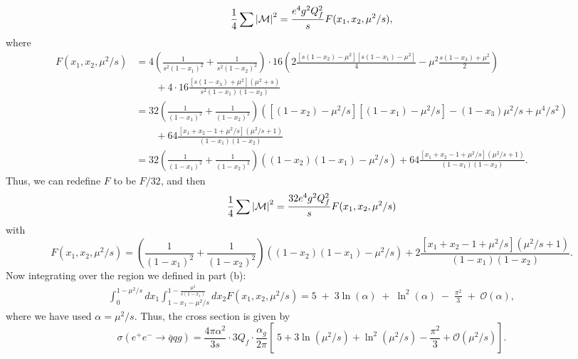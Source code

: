 \documentclass[11pt]{article}
\theoremstyle{definition}
\begin{document}
\begin{equation}
    \frac{1}{4}\sum\abs{\mathcal{M}}^2 = \frac{e^4g^2Q_f^2}{s}F(x_1,x_2,\mu^2/s),
\end{equation}
where
\begin{equation}
\begin{aligned}
        F(x_1,x_2,\mu^2/s) &= 4\left(\frac{1}{s^2(1-x_1)^2} + \frac{1}{s^2(1-x_2)^2}\right)\cdot 16\left(2\frac{[s(1-x_2)-\mu^2][s(1-x_1)-\mu^2]}{4} - \mu^2\frac{s(1-x_3)+\mu^2}{2}\right)\\
        &\qquad + 4\cdot16\frac{[s(1-x_3)+\mu^2](\mu^2+s)}{s^2(1-x_1)(1-x_2)}\\
        &= 32\left(\frac{1}{(1-x_1)^2} +\frac{1}{(1-x_2)^2}\right) \left([(1-x_2)-\mu^2/s][(1-x_1)-\mu^2/s] - (1-x_3)\mu^2/s+\mu^4/s^2\right)\\
        &\qquad + 64\frac{[x_1+x_2-1+\mu^2/s](\mu^2/s+1)}{(1-x_1)(1-x_2)}\\
        &=32\left(\frac{1}{(1-x_1)^2} +\frac{1}{(1-x_2)^2}\right) \left((1-x_2)(1-x_1) - \mu^2/s\right) + 64\frac{[x_1+x_2-1+\mu^2/s](\mu^2/s+1)}{(1-x_1)(1-x_2)}.
\end{aligned}
\end{equation}
Thus, we can redefine $F$ to be $F/32$, and then
\begin{equation}
    \frac{1}{4}\sum\abs{\mathcal{M}}^2 = \frac{32e^4g^2Q_f^2}{s}F(x_1,x_2,\mu^2/s)
\end{equation}
with
\begin{equation}
    F(x_1,x_2,\mu^2/s) = \left(\frac{1}{(1-x_1)^2} +\frac{1}{(1-x_2)^2}\right) \left((1-x_2)(1-x_1) - \mu^2/s\right) + 2\frac{[x_1+x_2-1+\mu^2/s](\mu^2/s+1)}{(1-x_1)(1-x_2)}.
\end{equation}
Now integrating over the region we defined in part (b):
\begin{equation}
    \begin{aligned}
        \int_0^{1-\mu^2/s} dx_1\int_{1-x_1-\mu^2/s}^{1-\frac{\mu^2}{s(1-x_1)}}dx_2 F(x_1,x_2,\mu^2/s)= 5 \;+\; 3 \ln(\alpha) \;+\; \ln^{2}(\alpha) \;-\; \tfrac{\pi^{2}}{3}
\;+\; \mathcal{O}(\alpha),
    \end{aligned}
 \end{equation}
 where we have used $\alpha= \mu^2/s$.
Thus, the cross section is given by 
\begin{equation}
    \sigma(e^+e^-\to \bar{q}qg) = \frac{4\pi\alpha^2}{3s}\cdot 3Q_f \cdot \frac{\alpha_g}{2\pi}\left[\; 5 + 3 \ln(\mu^2/s) + \ln^{2}(\mu^2/s) - \frac{\pi^{2}}{3}+ \mathcal{O}(\mu^2/s)\right].
\end{equation}
\end{document}
